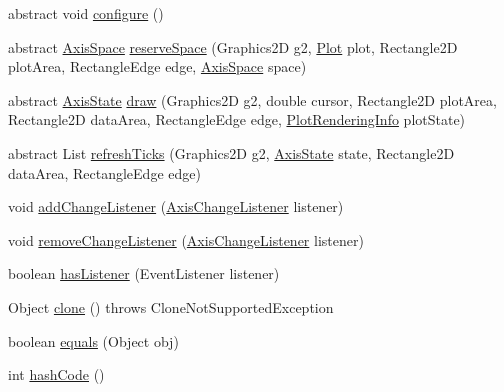 \begin{DoxyCompactItemize}
abstract void \mbox{\hyperlink{classorg_1_1jfree_1_1chart_1_1axis_1_1_axis_a02e97b6175f02020bcc15127b5882e63}{configure}} ()
\item 
abstract \mbox{\hyperlink{classorg_1_1jfree_1_1chart_1_1axis_1_1_axis_space}{Axis\+Space}} \mbox{\hyperlink{classorg_1_1jfree_1_1chart_1_1axis_1_1_axis_a888f0a481bd8b1dbf8e9c278ca4dceca}{reserve\+Space}} (Graphics2D g2, \mbox{\hyperlink{classorg_1_1jfree_1_1chart_1_1plot_1_1_plot}{Plot}} plot, Rectangle2D plot\+Area, Rectangle\+Edge edge, \mbox{\hyperlink{classorg_1_1jfree_1_1chart_1_1axis_1_1_axis_space}{Axis\+Space}} space)
\item 
abstract \mbox{\hyperlink{classorg_1_1jfree_1_1chart_1_1axis_1_1_axis_state}{Axis\+State}} \mbox{\hyperlink{classorg_1_1jfree_1_1chart_1_1axis_1_1_axis_a39a6bcf4a2e244f134d6247b7a96734a}{draw}} (Graphics2D g2, double cursor, Rectangle2D plot\+Area, Rectangle2D data\+Area, Rectangle\+Edge edge, \mbox{\hyperlink{classorg_1_1jfree_1_1chart_1_1plot_1_1_plot_rendering_info}{Plot\+Rendering\+Info}} plot\+State)
\item 
abstract List \mbox{\hyperlink{classorg_1_1jfree_1_1chart_1_1axis_1_1_axis_a1ea6ad0936c3aee959da3a9a21d61925}{refresh\+Ticks}} (Graphics2D g2, \mbox{\hyperlink{classorg_1_1jfree_1_1chart_1_1axis_1_1_axis_state}{Axis\+State}} state, Rectangle2D data\+Area, Rectangle\+Edge edge)
\item 
void \mbox{\hyperlink{classorg_1_1jfree_1_1chart_1_1axis_1_1_axis_a5529aef8c91a529add5a138bb2d0552a}{add\+Change\+Listener}} (\mbox{\hyperlink{interfaceorg_1_1jfree_1_1chart_1_1event_1_1_axis_change_listener}{Axis\+Change\+Listener}} listener)
\item 
void \mbox{\hyperlink{classorg_1_1jfree_1_1chart_1_1axis_1_1_axis_a4391388f91765cec42466ad85e4969a4}{remove\+Change\+Listener}} (\mbox{\hyperlink{interfaceorg_1_1jfree_1_1chart_1_1event_1_1_axis_change_listener}{Axis\+Change\+Listener}} listener)
\item 
boolean \mbox{\hyperlink{classorg_1_1jfree_1_1chart_1_1axis_1_1_axis_a082480ef7c916bc2b5aeaa9b053ee660}{has\+Listener}} (Event\+Listener listener)
\item 
Object \mbox{\hyperlink{classorg_1_1jfree_1_1chart_1_1axis_1_1_axis_af26aa9ca8d592fb08c529b0f0734d210}{clone}} ()  throws Clone\+Not\+Supported\+Exception 
\item 
boolean \mbox{\hyperlink{classorg_1_1jfree_1_1chart_1_1axis_1_1_axis_a676e18469466af6ba5620d099a7b87c0}{equals}} (Object obj)
\item 
int \mbox{\hyperlink{classorg_1_1jfree_1_1chart_1_1axis_1_1_axis_aa31c39d888c54cba84061d6439541f65}{hash\+Code}} ()
\end{DoxyCompactItemize}
